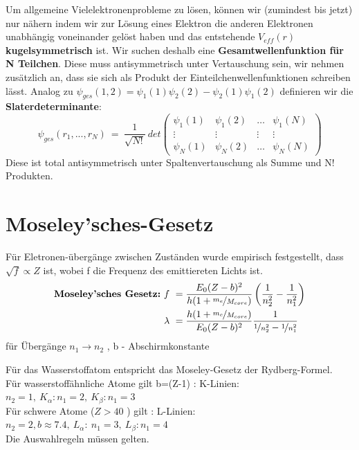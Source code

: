 \documentclass[Ex4_Zusammenfassung.tex]{subfiles}
\begin{document}
Um allgemeine Vielelektronenprobleme zu lösen, können wir (zumindest bis jetzt) nur nähern indem wir zur Lösung eines Elektron die anderen Elektronen unabhängig voneinander gelöst haben und das entstehende $ V_{eff}(r) $ \textbf{kugelsymmetrisch} ist. \newline
Wir suchen deshalb eine  \textbf{Gesamtwellenfunktion für N Teilchen}. \newline
Diese muss antisymmetrisch unter Vertauschung sein, wir nehmen zusätzlich an, dass sie sich als Produkt der Einteilchenwellenfunktionen schreiben lässt. \newline 
Analog zu $ \psi_{ges}(1,2) = \psi_1(1) \psi_2(2) - \psi_2(1) \psi_1(2) $  definieren wir die \\ \textbf{Slaterdeterminante}: 
	\begin{equation}
	  \psi_{ges}(r_1,...,r_N) \ = \  \frac{1}{\sqrt{N!}} \  det \begin{pmatrix} \psi_1(1) & \psi_1(2) & \dots & \psi_1(N) \\ \vdots & \vdots & \vdots & \vdots \\  \psi_N(1) & \psi_N(2) & \dots & \psi_N(N)  \end{pmatrix} 
	\end{equation}
Diese ist total antisymmetrisch unter Spaltenvertauschung als Summe und N! Produkten. 
\section{Moseley'sches-Gesetz}
Für Eletronen-übergänge zwischen Zuständen wurde empirisch festgestellt, dass $ \sqrt{f} \propto Z $ ist, wobei f die Frequenz des emittiereten Lichts ist. 
\begin{align*}
\textbf{Moseley'sches Gesetz:} \ f \ &= \frac{E_0 (Z-b)^2}{h (1+\nicefrac{m_e}{M_{core}})} \left(\frac{1}{n_2^2} - \frac{1}{n_1^2}\right) \\ 
\lambda \ & = \frac{h(1+\nicefrac{m_e}{M_{core}})}{E_0 (Z-b)^2} \frac{1}{\nicefrac{1}{n_2^2} - \nicefrac{1}{n_1^2}} 
\end{align*}
für Übergänge $ n_1 \rightarrow n_2 $ , b - Abschirmkonstante 

Für das Wasserstoffatom entspricht das Moseley-Gesetz der Rydberg-Formel.\\

Für wasserstoffähnliche Atome gilt b=(Z-1) : \newline \quad K-Linien: $ n_2 = 1, \  K_{\alpha} :  n_1 = 2, \  K_{\beta}: n_1 = 3 $ \\ \newline
Für schwere Atome ($ Z > 40 $  )  gilt : \newline \qquad L-Linien: $ n_2 = 2 , b \approx 7.4 , \ L_{\alpha} : \ n_1= 3 , \  L_{\beta}: n_1 = 4 $\\

Die Auswahlregeln müssen gelten.
\end{document}
